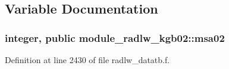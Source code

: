 \subsection{Variable Documentation}
\subsubsection[{\texorpdfstring{msa02}{msa02}}]{\setlength{\rightskip}{0pt plus 5cm}integer, public module\+\_\+radlw\+\_\+kgb02\+::msa02}\hypertarget{namespacemodule__radlw__kgb02_a370b514d7834ac2a22d245f118882bf4}{}\label{namespacemodule__radlw__kgb02_a370b514d7834ac2a22d245f118882bf4}


Definition at line 2430 of file radlw\+\_\+datatb.\+f.

